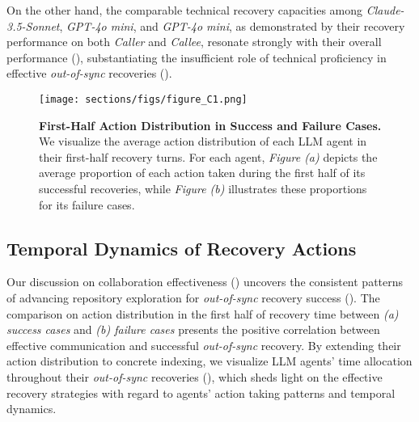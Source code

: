 On the other hand, the comparable technical recovery capacities among \textit{Claude-3.5-Sonnet}, \textit{GPT-4o mini}, and \textit{GPT-4o mini}, as demonstrated by their recovery performance on both \textit{Caller} and \textit{Callee}, resonate strongly with their overall performance (), substantiating the insufficient role of technical proficiency in effective \textit{out-of-sync} recoveries ().














\begin{figure}[H]
\begin{center}
\begin{small}
\vspace{-0.5em}
    \texttt{[image: sections/figs/figure\_C1.png]}
    \caption{\textbf{First-Half Action Distribution in Success and Failure Cases.} We visualize the average action distribution of each LLM agent in their first-half recovery turns. For each agent, \textit{Figure (a)} depicts the average proportion of each action taken during the first half of its successful recoveries, while \textit{Figure (b)} illustrates these proportions for its failure cases.}
    \label{fig:figure C1 (first-half action distribution)}
\vspace{0.5em}
\end{small}
\end{center}
\end{figure}



\subsection{Temporal Dynamics of Recovery Actions}
\label{Appendix C2: Temporal Dynamics of Recovery Actions}

Our discussion on collaboration effectiveness () uncovers the consistent patterns of advancing repository exploration for \textit{out-of-sync} recovery success (). The comparison on action distribution in the first half of recovery time between \textit{(a) success cases} and \textit{(b) failure cases} presents the positive correlation between effective communication and successful \textit{out-of-sync} recovery.
By extending their action distribution to concrete indexing, we visualize LLM agents' time allocation throughout their \textit{out-of-sync} recoveries (), which sheds light on the effective recovery strategies with regard to agents' action taking patterns and temporal dynamics. 



